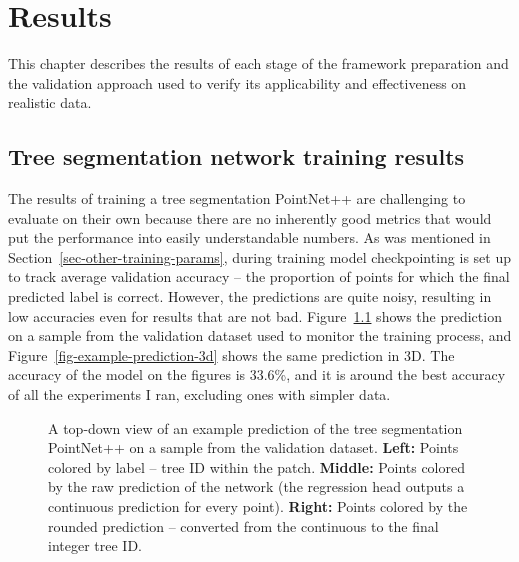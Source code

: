 \chapter{Results}\label{cap:results}

This chapter describes the results of each stage of the framework preparation and the validation approach used to verify its applicability and effectiveness on realistic data.

\section{Tree segmentation network training results}

The results of training a tree segmentation PointNet++ are challenging to evaluate on their own because there are no inherently good metrics that would put the performance into easily understandable numbers.
As was mentioned in Section~\ref{sec-other-training-params}, during training model checkpointing is set up to track average validation accuracy – the proportion of points for which the final predicted label is correct.
However, the predictions are quite noisy, resulting in low accuracies even for results that are not bad.
Figure~\ref{fig-example-prediction-2d} shows the prediction on a sample from the validation dataset used to monitor the training process, and Figure~\ref{fig-example-prediction-3d} shows the same prediction in 3D.
The accuracy of the model on the figures is 33.6\%, and it is around the best accuracy of all the experiments I ran, excluding ones with simpler data.

\begin{figure}
\caption[A top-down view of an example prediction of the tree segmentation PointNet++.]{\label{fig-example-prediction-2d}A top-down view of an example
prediction of the tree segmentation PointNet++ on a sample from the
validation dataset. \textbf{Left:} Points colored by label -- tree ID
within the patch. \textbf{Middle:} Points colored by the raw prediction
of the network (the regression head outputs a continuous prediction for
every point). \textbf{Right:} Points colored by the rounded prediction
-- converted from the continuous to the final integer tree ID.}
\end{figure}

